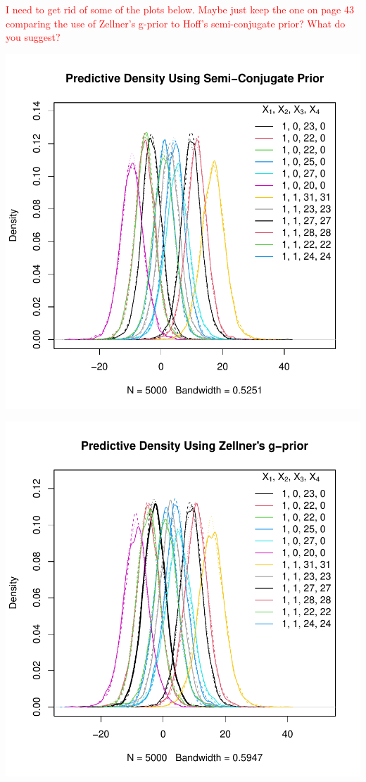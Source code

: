 \documentclass[12pt, a4paper]{article}
\begin{document}
\textcolor{red}{I need to get rid of some of the plots below.  Maybe just keep the one on page 43 comparing the use of Zellner's g-prior to Hoff's semi-conjugate prior?  What do you suggest?}

\includegraphics{Thesis_v1-015}




\includegraphics{Thesis_v1-016}
\end{document}
